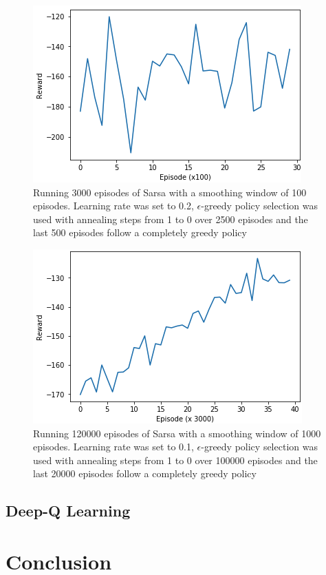 \documentclass[letterpaper]{article} %
\begin{document}
\begin{figure}
\label{alpha2}
  \includegraphics[width = \columnwidth]{sarsa_3k_alpha2}
  \caption{Running 3000 episodes of Sarsa with a smoothing window of 100 episodes. Learning rate was set to 0.2, $\epsilon$-greedy policy selection was used with annealing steps from 1 to 0 over 2500 episodes and the last 500 episodes follow a completely greedy policy }
\end{figure}


\begin{figure}
\label{100k}
  \includegraphics[width = \columnwidth]{sarsa_120k_3kwindow}
  \caption{Running 120000 episodes of Sarsa with a smoothing window of 1000 episodes. Learning rate was set to 0.1, $\epsilon$-greedy policy selection was used with annealing steps from 1 to 0 over 100000 episodes and the last 20000 episodes follow a completely greedy policy }
\end{figure}


\subsection{Deep-Q Learning}



\section{Conclusion}

\medskip
\printbibliography
\end{document}
